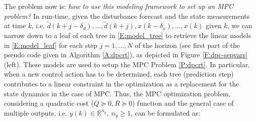 \textcolor[rgb]{0,0,1}{The problem now is: \emph{how to use this modeling framework to set up an MPC problem?} In run-time, given the disturbance forecast and the state measurements at time $k$, i.e. $\tilde d(k+j-\delta_d),\ldots,\tilde d(k+j),x(k-\delta_x),\ldots,x(k)$ given $k$, we can narrow down to a leaf of each tree in \eqref{E:model_tree} to retrieve the linear models in \eqref{E:model_leaf} for each step $j=1,\ldots,N$ of the horizon (see first part of the pseudo code given in Algorithm \ref{A:dpcrt}), as depicted in Figure \ref{F:dpc-sepvars} (left). These models are used to setup the MPC Problem \ref{P:dpcrt}.
In particular, }when a new control action has to be determined, each tree (prediction step) contributes to a linear constraint in the optimization as a replacement for the state dynamics in the case of MPC. Thus, the MPC optimization problem, considering a quadratic cost ($Q \succeq 0, R \succeq 0$) function and the general case of multiple outputs, i.e. $y(k)\in\mathbb{R}^{n_y},\ n_y\geq 1$, can be formulated as:
